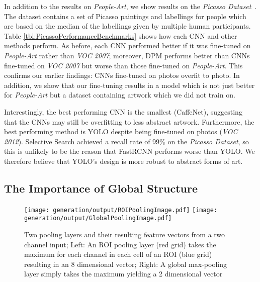 \documentclass[runningheads]{llncs}
\begin{document}
In addition to the results on \textit{People-Art}, we show results on the \textit{Picasso Dataset}~\cite{ginosar2014detecting}.
The dataset contains a set of Picasso paintings and labellings for people which are based on the median of the labellings given by multiple human participants.
Table \ref{tbl:PicassoPerformanceBenchmarks} shows how each \ac{CNN} and other methods perform.
As before, each \ac{CNN} performed better if it was fine-tuned on \textit{People-Art} rather than \textit{VOC 2007}; moreover, \ac{DPM} performs better than \acp{CNN} fine-tuned on \textit{VOC 2007} but worse than those fine-tuned on \textit{People-Art}.
This confirms our earlier findings: \acp{CNN} fine-tuned on \acp{photo} overfit to \ac{photo}.
In addition, we show that our fine-tuning results in a model which is not just better for \textit{People-Art} but a dataset containing \ac{artwork} which we did not train on.

Interestingly, the best performing \ac{CNN} is the smallest (CaffeNet), suggesting that the \acp{CNN} may still be overfitting to less abstract \ac{artwork}.
Furthermore, the best performing method is \ac{YOLO} despite being fine-tuned on \acp{photo} (\textit{VOC 2012}).
Selective Search achieved a recall rate of 99\%  on the \textit{Picasso Dataset}, so this is unlikely to be the reason that \ac{FastRCNN} performs worse than \ac{YOLO}.
We therefore believe that \ac{YOLO}'s design is more robust to abstract forms of art.
 
\subsection{The Importance of Global Structure}
\label{sec:structure}
\begin{figure}[b]
  \hfill
  \texttt{[image: generation/output/ROIPoolingImage.pdf]} \hfill
  \texttt{[image: generation/output/GlobalPoolingImage.pdf]}
  \hfill
  \caption{Two pooling layers and their resulting feature vectors from a two channel input; Left: An ROI pooling layer (red grid) takes the maximum for each channel in each cell of an ROI (blue grid) resulting in an 8 dimensional vector; Right: A global max-pooling layer simply takes the maximum yielding a 2 dimensional vector\label{fig:ROIPool}}
\end{figure}
\end{document}
